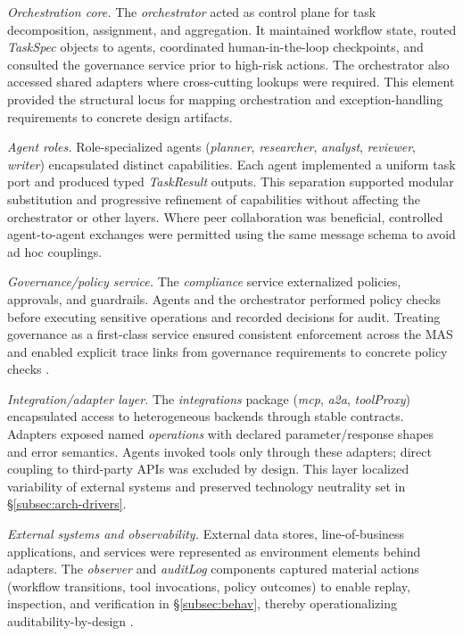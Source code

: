 \emph{Orchestration core.} The \emph{orchestrator} acted as control plane for task decomposition, assignment, and aggregation. It maintained workflow state, routed \emph{TaskSpec} objects to agents, coordinated human-in-the-loop checkpoints, and consulted the governance service prior to high-risk actions. The orchestrator also accessed shared adapters where cross-cutting lookups were required. This element provided the structural locus for mapping orchestration and exception-handling requirements to concrete design artifacts.

\emph{Agent roles.} Role-specialized agents (\emph{planner}, \emph{researcher}, \emph{analyst}, \emph{reviewer}, \emph{writer}) encapsulated distinct capabilities. Each agent implemented a uniform task port and produced typed \emph{TaskResult} outputs. This separation supported modular substitution and progressive refinement of capabilities without affecting the orchestrator or other layers. Where peer collaboration was beneficial, controlled agent-to-agent exchanges were permitted using the same message schema to avoid ad hoc couplings.

\emph{Governance/policy service.} The \emph{compliance} service externalized policies, approvals, and guardrails. Agents and the orchestrator performed policy checks before executing sensitive operations and recorded decisions for audit. Treating governance as a first-class service ensured consistent enforcement across the MAS and enabled explicit trace links from governance requirements to concrete policy checks \parencite{IEEEStandard1990}.

\emph{Integration/adapter layer.} The \emph{integrations} package (\emph{mcp}, \emph{a2a}, \emph{toolProxy}) encapsulated access to heterogeneous backends through stable contracts. Adapters exposed named \emph{operations} with declared parameter/response shapes and error semantics. Agents invoked tools only through these adapters; direct coupling to third-party APIs was excluded by design. This layer localized variability of external systems and preserved technology neutrality set in §\ref{subsec:arch-drivers}.

\emph{External systems and observability.} External data stores, line-of-business applications, and services were represented as environment elements behind adapters. The \emph{observer} and \emph{auditLog} components captured material actions (workflow transitions, tool invocations, policy outcomes) to enable replay, inspection, and verification in §\ref{subsec:behav}, thereby operationalizing auditability-by-design \parencite{IEEEStandard1990}.

